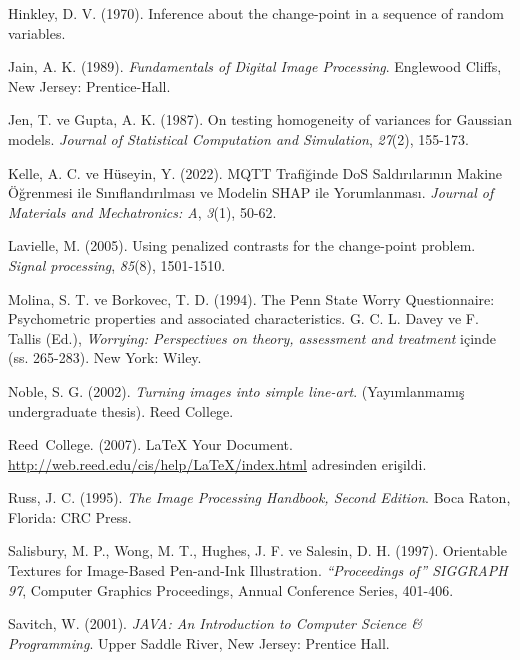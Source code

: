 \documentclass[12pt,twoside]{deuthesis}
\begin{document}
\begin{CSLReferences}{1}{0}
\leavevmode{}%
Hinkley, D. V. (1970). Inference about the change-point in a sequence of random variables.

\leavevmode{}%
Jain, A. K. (1989). \emph{Fundamentals of Digital Image Processing}. Englewood Cliffs, New Jersey: Prentice-Hall.

\leavevmode{}%
Jen, T. ve Gupta, A. K. (1987). On testing homogeneity of variances for Gaussian models. \emph{Journal of Statistical Computation and Simulation}, \emph{27}(2), 155-173.

\leavevmode{}%
Kelle, A. C. ve Hüseyin, Y. (2022). MQTT Trafi{ğ}inde DoS Sald{ı}r{ı}lar{ı}n{ı}n Makine {Ö}{ğ}renmesi ile S{ı}n{ı}fland{ı}r{ı}lmas{ı} ve Modelin SHAP ile Yorumlanmas{ı}. \emph{Journal of Materials and Mechatronics: A}, \emph{3}(1), 50-62.

\leavevmode{}%
Lavielle, M. (2005). Using penalized contrasts for the change-point problem. \emph{Signal processing}, \emph{85}(8), 1501-1510.

\leavevmode{}%
Molina, S. T. ve Borkovec, T. D. (1994). The {P}enn {S}tate Worry Questionnaire: Psychometric properties and associated characteristics. G. C. L. Davey ve F. Tallis (Ed.), \emph{Worrying: Perspectives on theory, assessment and treatment} içinde (ss. 265-283). New York: Wiley.

\leavevmode{}%
Noble, S. G. (2002). \emph{Turning images into simple line-art}. (Yayımlanmamış undergraduate thesis). Reed College.

\leavevmode{}%
Reed~College. (2007). LaTeX Your Document. \url{http://web.reed.edu/cis/help/LaTeX/index.html} adresinden erişildi.

\leavevmode{}%
Russ, J. C. (1995). \emph{{The Image Processing Handbook, Second Edition}}. Boca Raton, Florida: CRC Press.

\leavevmode{}%
Salisbury, M. P., Wong, M. T., Hughes, J. F. ve Salesin, D. H. (1997). Orientable Textures for Image-Based Pen-and-Ink Illustration. \emph{{``Proceedings of''} SIGGRAPH 97}, Computer Graphics Proceedings, Annual Conference Series, 401-406.

\leavevmode{}%
Savitch, W. (2001). \emph{JAVA: An Introduction to Computer Science \& Programming}. Upper Saddle River, New Jersey: Prentice Hall.


\end{CSLReferences}
\end{document}
